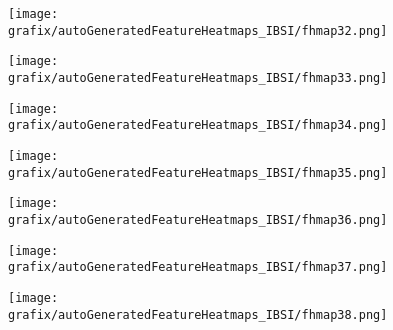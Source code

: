 \begin{subfigure}{\wid\textwidth} 
    \centering 
    \caption{\tiny \sffamily {}} 
    \vspace{\vsp} 
    \texttt{[image: grafix/autoGeneratedFeatureHeatmaps\_IBSI/fhmap32.png]} 
\end{subfigure} 
\hspace{\hsp} 
\begin{subfigure}{\wid\textwidth} 
    \centering 
    \caption{\tiny \sffamily {}} 
    \vspace{\vsp} 
    \texttt{[image: grafix/autoGeneratedFeatureHeatmaps\_IBSI/fhmap33.png]} 
\end{subfigure} 
\hspace{\hsp} 
\begin{subfigure}{\wid\textwidth} 
    \centering 
    \caption{\tiny \sffamily {}} 
    \vspace{\vsp} 
    \texttt{[image: grafix/autoGeneratedFeatureHeatmaps\_IBSI/fhmap34.png]} 
\end{subfigure} 
\hspace{\hsp} 
\begin{subfigure}{\wid\textwidth} 
    \centering 
    \caption{\tiny \sffamily {}} 
    \vspace{\vsp} 
    \texttt{[image: grafix/autoGeneratedFeatureHeatmaps\_IBSI/fhmap35.png]} 
\end{subfigure} 
\hspace{\hsp} 
\begin{subfigure}{\wid\textwidth} 
    \centering 
    \caption{\tiny \sffamily {}} 
    \vspace{\vsp} 
    \texttt{[image: grafix/autoGeneratedFeatureHeatmaps\_IBSI/fhmap36.png]} 
\end{subfigure} 
\hspace{\hsp} 
\begin{subfigure}{\wid\textwidth} 
    \centering 
    \caption{\tiny \sffamily {}} 
    \vspace{\vsp} 
    \texttt{[image: grafix/autoGeneratedFeatureHeatmaps\_IBSI/fhmap37.png]} 
\end{subfigure} 
\hspace{\hsp} 
\begin{subfigure}{\wid\textwidth} 
    \centering 
    \caption{\tiny \sffamily {}} 
    \vspace{\vsp} 
    \texttt{[image: grafix/autoGeneratedFeatureHeatmaps\_IBSI/fhmap38.png]} 
\end{subfigure} 
